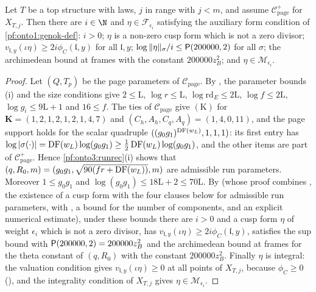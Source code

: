 \begin{proposition}\label{pf:onto3:etaok}
Let $T$ be a top structure with laws, $j$ in range with $j<m$, and assume $\mathcal C^+_{\mathrm{page}}$ for $X_{T,j}$. Then
there are $i\in\N$ and $\eta\in\mathcal F_{\epsilon_i}$ satisfying the auxiliary form condition of
\cref{pf:onto1:genok-def}: $i>0$; $\eta$ is a non-zero cusp form which is not a zero divisor; $v_{\mathfrak l,y}(\iota\eta)\ge
2i\phi_C(\mathfrak l,y)$ for all $\mathfrak l,y$; $\log\|\eta\|_\sigma/i\le\mathsf{P}(200000,2)$ for all $\sigma$; the
archimedean bound at frames with the constant $200000z_B^2$; and $\eta\in\mathcal M_{\epsilon_i}$.
\end{proposition}

\begin{proof}
Let $(Q,T_p)$ be the page parameters of $\mathcal C_{\mathrm{page}}$. By , the
parameter bounds (i) and the size conditions give $2\le\mathrm L$, $\log r\le\mathrm L$, $\log\mathrm{rd}_E\le2\mathrm L$,
$\log f\le2\mathrm L$, $\log g_i\le9\mathrm L+1$ and $16\le f$. The ties of $\mathcal C_{\mathrm{page}}$ give $(\mathrm K)$ for
$\mathbf K=(1,2,1,2,1,2,1,4,7)$ and $(C_h,A_h,C_q,A_q)=(1,4,0,11)$, and the page support holds for the scalar quadruple
$((g_0g_1)^{\operatorname{DF}(w_L)},1,1,1)$: its first entry has $\log|\sigma(\cdot)|=\operatorname{DF}(w_L)\log(g_0g_1)\ge
\frac12\operatorname{DF}(w_L)\log(g_0g_1)$, and the other items are part of $\mathcal C^+_{\mathrm{page}}$. Hence
\cref{pf:onto3:runrec}(i) shows that $(q,R_0,m)=(g_0g_1,\sqrt{90(fr+\operatorname{DF}(w_L))},m)$ are admissible run parameters.
Moreover $1\le g_0g_1$ and $\log(g_0g_1)\le18\mathrm L+2\le70\mathrm L$. By
 (whose proof combines
, the existence of a cusp form with the four
clauses below for admissible run parameters, with , a bound
for the number of components, and an explicit numerical estimate), under these bounds there are $i>0$ and a cusp form
$\eta$ of weight $\epsilon_i$ which is not a zero divisor, has $v_{\mathfrak l,y}(\iota\eta)\ge2i\phi_C(\mathfrak l,y)$, satisfies
the sup bound with $\mathsf{P}(200000,2)=200000z_B^2$ and the archimedean bound at frames for the theta constant of
$(q,R_0)$ with the constant $200000z_B^2$. Finally $\eta$ is integral: the valuation condition gives
$v_{\mathfrak l,y}(\iota\eta)\ge0$ at all points of $X_{T,j}$, because $\phi_C\ge0$
(), and the integrality condition of $X_{T,j}$ gives $\eta\in
\mathcal M_{\epsilon_i}$.
\end{proof}


